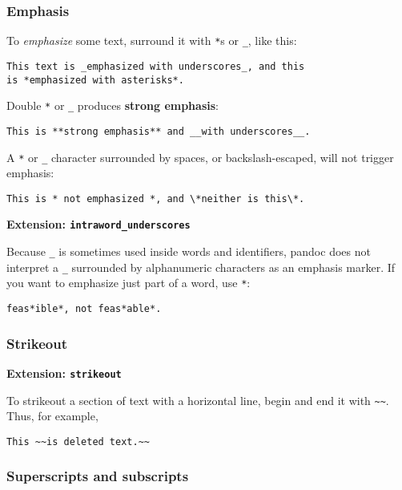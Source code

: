 \documentclass[]{article}
\begin{document}
\subsubsection{Emphasis}

To \emph{emphasize} some text, surround it with \texttt{*}s or
\texttt{\_}, like this:

\begin{verbatim}
This text is _emphasized with underscores_, and this
is *emphasized with asterisks*.
\end{verbatim}

Double \texttt{*} or \texttt{\_} produces \textbf{strong emphasis}:

\begin{verbatim}
This is **strong emphasis** and __with underscores__.
\end{verbatim}

A \texttt{*} or \texttt{\_} character surrounded by spaces, or
backslash-escaped, will not trigger emphasis:

\begin{verbatim}
This is * not emphasized *, and \*neither is this\*.
\end{verbatim}

\textbf{Extension: \texttt{intraword\_underscores}}

Because \texttt{\_} is sometimes used inside words and identifiers,
pandoc does not interpret a \texttt{\_} surrounded by alphanumeric
characters as an emphasis marker. If you want to emphasize just part of
a word, use \texttt{*}:

\begin{verbatim}
feas*ible*, not feas*able*.
\end{verbatim}

\subsubsection{Strikeout}

\textbf{Extension: \texttt{strikeout}}

To strikeout a section of text with a horizontal line, begin and end it
with \texttt{\textasciitilde{}\textasciitilde{}}. Thus, for example,

\begin{verbatim}
This ~~is deleted text.~~
\end{verbatim}

\subsubsection{Superscripts and subscripts}
\end{document}
